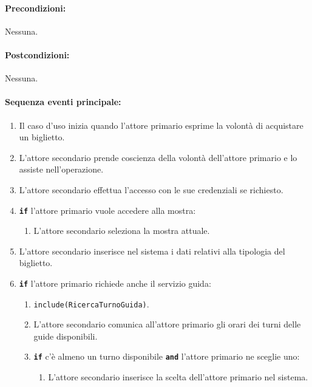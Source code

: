 \documentclass{article}
\begin{document}
	\paragraph{Precondizioni:}Nessuna.
	
	\paragraph{Postcondizioni:}Nessuna.
	
	\paragraph{Sequenza eventi principale:}

		\begin{enumerate}[itemsep=5pt,parsep=0pt]

		\item Il caso d'uso inizia quando l'attore primario esprime la volontà di acquistare un biglietto.

		\item L'attore secondario prende coscienza della volontà dell'attore primario e lo assiste nell'operazione.

		\item L'attore secondario effettua l'accesso con le sue credenziali se richiesto.

		\item \texttt{\textbf{if}} l'attore primario vuole accedere alla mostra:
			\begin{enumerate}	[leftmargin=28pt]
				\item L'attore secondario seleziona la mostra attuale.
  			\end{enumerate}	

		\item L'attore secondario inserisce nel sistema i dati relativi alla tipologia del biglietto.

		\item \texttt{\textbf{if}} l'attore primario richiede anche il servizio guida:
			\begin{enumerate}[leftmargin=28pt]
				\item  \texttt{{include(RicercaTurnoGuida)}}.
				\item L'attore secondario comunica all'attore primario gli orari dei turni delle guide disponibili.
				\item \texttt{\textbf{if}} c'è almeno un turno disponibile \texttt{\textbf{and}} l'attore primario ne sceglie uno:
					\begin{enumerate}[leftmargin=34pt]
						\item L'attore secondario inserisce la scelta dell'attore primario nel sistema.
					\end{enumerate}
  			\end{enumerate}	


\end{enumerate}
\end{document}
